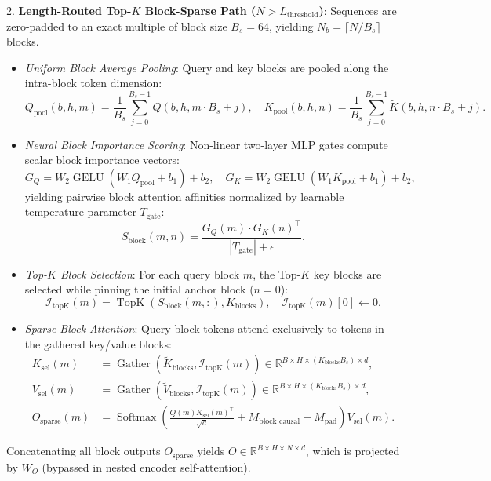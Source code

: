 2. \textbf{Length-Routed Top-$K$ Block-Sparse Path ($N > L_{\text{threshold}}$)}:
Sequences are zero-padded to an exact multiple of block size $B_s = 64$, yielding $N_b = \lceil N / B_s \rceil$ blocks.
\begin{itemize}
    \item \emph{Uniform Block Average Pooling}: Query and key blocks are pooled along the intra-block token dimension:
    \begin{equation}
    Q_{\text{pool}}(b, h, m) = \frac{1}{B_s} \sum_{j=0}^{B_s-1} Q(b, h, m \cdot B_s + j), \quad K_{\text{pool}}(b, h, n) = \frac{1}{B_s} \sum_{j=0}^{B_s-1} \widetilde{K}(b, h, n \cdot B_s + j).
    \end{equation}
    \item \emph{Neural Block Importance Scoring}: Non-linear two-layer MLP gates compute scalar block importance vectors:
    \begin{equation}
    G_Q = W_2 \operatorname{GELU}(W_1 Q_{\text{pool}} + b_1) + b_2, \quad G_K = W_2 \operatorname{GELU}(W_1 K_{\text{pool}} + b_1) + b_2,
    \end{equation}
    yielding pairwise block attention affinities normalized by learnable temperature parameter $T_{\text{gate}}$:
    \begin{equation}
    S_{\text{block}}(m, n) = \frac{G_Q(m) \cdot G_K(n)^\top}{|T_{\text{gate}}| + \epsilon}.
    \end{equation}
    \item \emph{Top-$K$ Block Selection}: For each query block $m$, the Top-$K$ key blocks are selected while pinning the initial anchor block ($n=0$):
    \begin{equation}
    \mathcal{I}_{\text{topK}}(m) = \operatorname{TopK}\left(S_{\text{block}}(m, :), K_{\text{blocks}}\right), \quad \mathcal{I}_{\text{topK}}(m)[0] \leftarrow 0.
    \end{equation}
    \item \emph{Sparse Block Attention}: Query block tokens attend exclusively to tokens in the gathered key/value blocks:
    \begin{align}
    K_{\text{sel}}(m) &= \operatorname{Gather}\left(\widetilde{K}_{\text{blocks}}, \mathcal{I}_{\text{topK}}(m)\right) \in \mathbb{R}^{B \times H \times (K_{\text{blocks}} B_s) \times d}, \\
    V_{\text{sel}}(m) &= \operatorname{Gather}\left(\widetilde{V}_{\text{blocks}}, \mathcal{I}_{\text{topK}}(m)\right) \in \mathbb{R}^{B \times H \times (K_{\text{blocks}} B_s) \times d}, \\
    O_{\text{sparse}}(m) &= \operatorname{Softmax}\left(\frac{Q(m) K_{\text{sel}}(m)^\top}{\sqrt{d}} + M_{\text{block\_causal}} + M_{\text{pad}}\right) V_{\text{sel}}(m).
    \end{align}
\end{itemize}
Concatenating all block outputs $O_{\text{sparse}}$ yields $O \in \mathbb{R}^{B \times H \times N \times d}$, which is projected by $W_O$ (bypassed in nested encoder self-attention).

